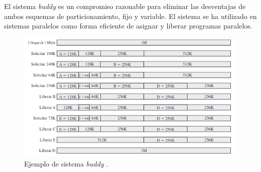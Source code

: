 \documentclass[12pt,a4paper]{article}
\begin{document}
El sistema \textit{buddy} es un compromiso razonable para eliminar las desventajas de ambos esquemas de particionamiento, fijo y variable. El sistema se ha utilizado en sistemas paralelos como forma eficiente de asignar y liberar programas paralelos.
\begin{figure}[H]
    \centering
    \includegraphics[width=15cm]{buddy.png}\par
    \caption{Ejemplo de sistema \textit{buddy} . }
\end{figure}
\end{document}
